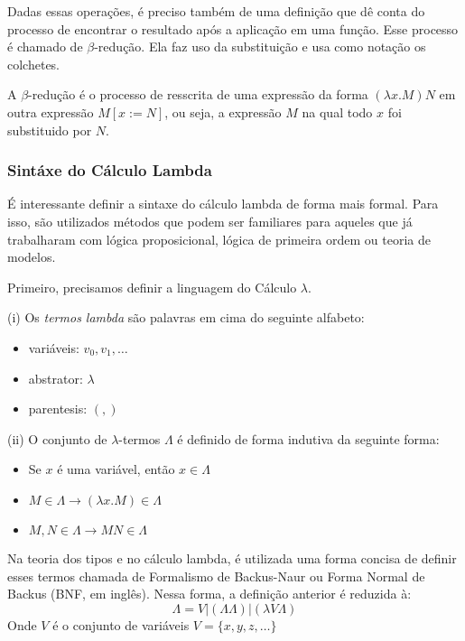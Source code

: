 \documentclass[../main.tex]{subfiles}
\begin{document}
Dadas essas operações, é preciso também de uma definição que dê conta do processo de encontrar o resultado após a aplicação em uma função. Esse processo é chamado de $\beta$-redução. Ela faz uso da substituição e usa como notação os colchetes.

\begin{definition}
    A $\beta$-redução é o processo de resscrita de uma expressão da forma $(\lambda x . M)N$ em outra expressão $M[x := N]$, ou seja, a expressão $M$ na qual todo $x$ foi substituido por $N$.    
\end{definition}

\subsubsection{Sintáxe do Cálculo Lambda}

É interessante definir a sintaxe do cálculo lambda de forma mais formal. Para isso, são utilizados métodos que podem ser familiares para aqueles que já trabalharam com lógica proposicional, lógica de primeira ordem ou teoria de modelos.

Primeiro, precisamos definir a linguagem do Cálculo $\lambda$.

\begin{definition}
    (i) Os \emph{termos lambda} são palavras em cima do seguinte alfabeto:
    \begin{itemize}
        \item variáveis: $v_0, v_1, \dots$ 
        \item abstrator: $\lambda$ 
        \item parentesis: $( , )$ 
    \end{itemize}
    (ii) O conjunto de $\lambda$-termos $\Lambda$ é definido de forma indutiva da seguinte forma:
    \begin{itemize}
        \item Se $x$ é uma variável, então $x \in \Lambda$
        \item $M \in \Lambda \to (\lambda x . M) \in \Lambda$
        \item $M, N \in \Lambda \to M N \in \Lambda$
    \end{itemize}
\end{definition}

Na teoria dos tipos e no cálculo lambda, é utilizada uma forma concisa de definir esses termos chamada de Formalismo de Backus-Naur ou Forma Normal de Backus (BNF, em inglês). Nessa forma, a definição anterior é reduzida à:
$$\Lambda = V | (\Lambda \Lambda) | (\lambda V \Lambda)$$
Onde $V$ é o conjunto de variáveis $V = \{x, y, z, \dots\}$
\end{document}
